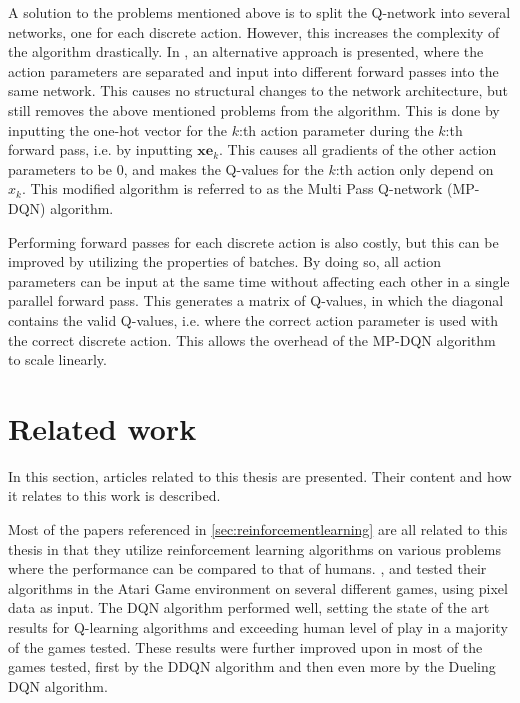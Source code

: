 \documentclass{kththesis}
\begin{document}
A solution to the problems mentioned above is to split the Q-network into several networks, one for each discrete action. However, this increases the complexity of the algorithm drastically. In \textcite{bester2019mpdqn}, an alternative approach is presented, where the action parameters are separated and input into different forward passes into the same network. This causes no structural changes to the network architecture, but still removes the above mentioned problems from the algorithm. This is done by inputting the one-hot vector for the $k$:th action parameter during the $k$:th forward pass, i.e. by inputting $\boldsymbol{x}\boldsymbol{e}_k$. This causes all gradients of the other action parameters to be $0$, and makes the Q-values for the $k$:th action only depend on $x_k$. This modified algorithm is referred to as the Multi Pass Q-network (MP-DQN) algorithm. \parencite{bester2019mpdqn}

Performing forward passes for each discrete action is also costly, but this can be improved by utilizing the properties of batches. By doing so, all action parameters can be input at the same time without affecting each other in a single parallel forward pass. This generates a matrix of Q-values, in which the diagonal contains the valid Q-values, i.e. where the correct action parameter is used with the correct discrete action. This allows the overhead of the MP-DQN algorithm to scale linearly. \parencite{bester2019mpdqn}

\section{Related work}
In this section, articles related to this thesis are presented. Their content and how it relates to this work is described.

Most of the papers referenced in \autoref{sec:reinforcementlearning} are all related to this thesis in that they utilize reinforcement learning algorithms on various problems where the performance can be compared to that of humans. \textcite{mnih2015human}, \textcite{van2016deep} and \textcite{wang2015dueling} tested their algorithms in the Atari Game environment on several different games, using pixel data as input. The DQN algorithm performed well, setting the state of the art results for Q-learning algorithms and exceeding human level of play in a majority of the games tested. These results were further improved upon in most of the games tested, first by the DDQN algorithm and then even more by the Dueling DQN algorithm. 
\end{document}
